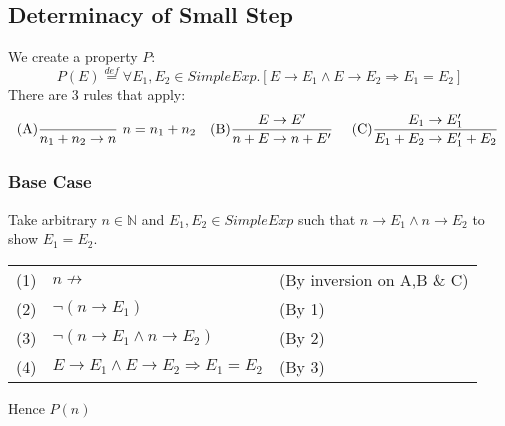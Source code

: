 \documentclass{report}
\begin{document}
        \subsection*{Determinacy of Small Step}
            We create a property $P$:
            \[P(E) \overset{def}{=} \forall E_1,E_2 \in SimpleExp .[E \to E_1 \land E \to E_2 \Rightarrow E_1 = E_2] \]
            There are 3 rules that apply:
            \[\begin{matrix}
                \text{(A)}\dfrac{}{n_1 + n_2 \to n} \ n = n_1 + n_2 & \text{(B)}\dfrac{E \to E'}{n + E \to n + E'} \  & \text{(C)}\dfrac{E_1 \to E_1'}{E_1 + E_2 \to E_1' + E_2} \ 
            \end{matrix}\]
            \subsubsection*{Base Case}
                Take arbitrary $n \in \mathbb{N}$ and $E_1,E_2 \in SimpleExp$ such that $n \to E_1 \land n \to E_2$ to show $E_1 = E_2$.
                \begin{center}
                    \begin{tabular}{l l l}
                        (1) & $n \not\to$ & (By inversion on A,B \& C) \\
                        (2) & $\neg (n \to E_1)$ & (By 1) \\
                        (3) & $\neg (n \to E_1 \land n \to E_2)$ & (By 2) \\
                        (4) & $E \to E_1 \land E \to E_2 \Rightarrow E_1 = E_2$ & (By 3) \\
                    \end{tabular}
                \end{center}
                Hence $P(n)$
\end{document}
